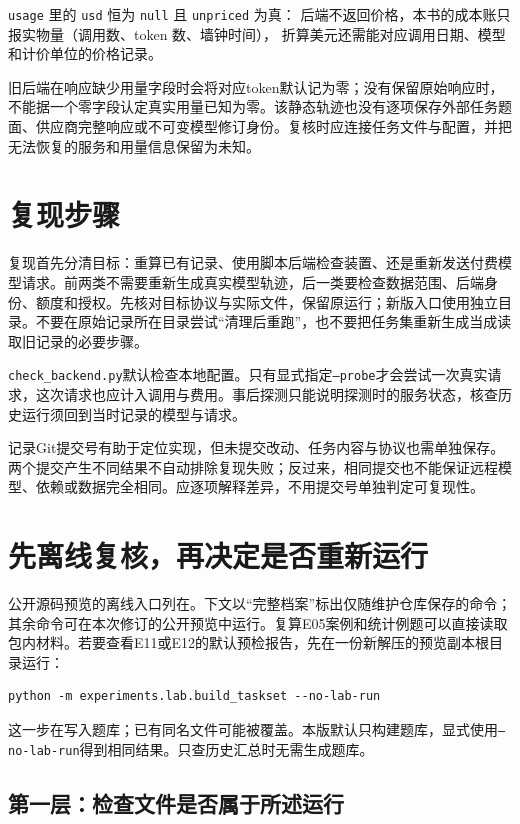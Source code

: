 \texttt{usage} 里的 \texttt{usd} 恒为 \texttt{null} 且 \texttt{unpriced} 为真：
后端不返回价格，本书的成本账只报实物量（调用数、token 数、墙钟时间），
折算美元还需能对应调用日期、模型和计价单位的价格记录。

旧后端在响应缺少用量字段时会将对应token默认记为零；没有保留原始响应时，不能据一个零字段认定真实用量已知为零。该静态轨迹也没有逐项保存外部任务题面、供应商完整响应或不可变模型修订身份。复核时应连接任务文件与配置，并把无法恢复的服务和用量信息保留为未知。

\section{复现步骤}

\begin{sloppypar}
复现首先分清目标：重算已有记录、使用脚本后端检查装置、还是重新发送付费模型请求。前两类不需要重新生成真实模型轨迹，后一类要检查数据范围、后端身份、额度和授权。先核对目标协议与实际文件，保留原运行；新版入口使用独立目录。不要在原始记录所在目录尝试“清理后重跑”，也不要把任务集重新生成当成读取旧记录的必要步骤。

\texttt{check\_backend.py}默认检查本地配置。只有显式指定\texttt{--probe}才会尝试一次真实请求，这次请求也应计入调用与费用。事后探测只能说明探测时的服务状态，核查历史运行须回到当时记录的模型与请求。

记录Git提交号有助于定位实现，但未提交改动、任务内容与协议也需单独保存。两个提交产生不同结果不自动排除复现失败；反过来，相同提交也不能保证远程模型、依赖或数据完全相同。应逐项解释差异，不用提交号单独判定可复现性。
\end{sloppypar}

\section{先离线复核，再决定是否重新运行}
\label{sec:appd-offline}

公开源码预览的离线入口列在。下文以“完整档案”标出仅随维护仓库保存的命令；其余命令可在本次修订的公开预览中运行。复算E05案例和统计例题可以直接读取包内材料。若要查看E11或E12的默认预检报告，先在一份新解压的预览副本根目录运行：
\begin{verbatim}
python -m experiments.lab.build_taskset --no-lab-run
\end{verbatim}
这一步在写入题库；已有同名文件可能被覆盖。本版默认只构建题库，显式使用\texttt{--no-lab-run}得到相同结果。只查历史汇总时无需生成题库。

\subsection{第一层：检查文件是否属于所述运行}

